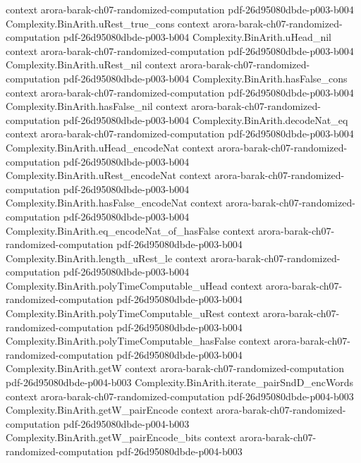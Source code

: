 \begin{theorem}
  {context}
  {arora-barak-ch07-randomized-computation}
  {pdf-26d95080dbde-p003-b004}
\proofstep
  {Complexity.BinArith.uRest_true_cons}
  {context}
  {arora-barak-ch07-randomized-computation}
  {pdf-26d95080dbde-p003-b004}
\proofstep
  {Complexity.BinArith.uHead_nil}
  {context}
  {arora-barak-ch07-randomized-computation}
  {pdf-26d95080dbde-p003-b004}
\proofstep
  {Complexity.BinArith.uRest_nil}
  {context}
  {arora-barak-ch07-randomized-computation}
  {pdf-26d95080dbde-p003-b004}
\proofstep
  {Complexity.BinArith.hasFalse_cons}
  {context}
  {arora-barak-ch07-randomized-computation}
  {pdf-26d95080dbde-p003-b004}
\proofstep
  {Complexity.BinArith.hasFalse_nil}
  {context}
  {arora-barak-ch07-randomized-computation}
  {pdf-26d95080dbde-p003-b004}
\proofstep
  {Complexity.BinArith.decodeNat_eq}
  {context}
  {arora-barak-ch07-randomized-computation}
  {pdf-26d95080dbde-p003-b004}
\proofstep
  {Complexity.BinArith.uHead_encodeNat}
  {context}
  {arora-barak-ch07-randomized-computation}
  {pdf-26d95080dbde-p003-b004}
\proofstep
  {Complexity.BinArith.uRest_encodeNat}
  {context}
  {arora-barak-ch07-randomized-computation}
  {pdf-26d95080dbde-p003-b004}
\proofstep
  {Complexity.BinArith.hasFalse_encodeNat}
  {context}
  {arora-barak-ch07-randomized-computation}
  {pdf-26d95080dbde-p003-b004}
\proofstep
  {Complexity.BinArith.eq_encodeNat_of_hasFalse}
  {context}
  {arora-barak-ch07-randomized-computation}
  {pdf-26d95080dbde-p003-b004}
\proofstep
  {Complexity.BinArith.length_uRest_le}
  {context}
  {arora-barak-ch07-randomized-computation}
  {pdf-26d95080dbde-p003-b004}
\proofstep
  {Complexity.BinArith.polyTimeComputable_uHead}
  {context}
  {arora-barak-ch07-randomized-computation}
  {pdf-26d95080dbde-p003-b004}
\proofstep
  {Complexity.BinArith.polyTimeComputable_uRest}
  {context}
  {arora-barak-ch07-randomized-computation}
  {pdf-26d95080dbde-p003-b004}
\proofstep
  {Complexity.BinArith.polyTimeComputable_hasFalse}
  {context}
  {arora-barak-ch07-randomized-computation}
  {pdf-26d95080dbde-p003-b004}
\proofstep
  {Complexity.BinArith.getW}
  {context}
  {arora-barak-ch07-randomized-computation}
  {pdf-26d95080dbde-p004-b003}
\proofstep
  {Complexity.BinArith.iterate_pairSndD_encWords}
  {context}
  {arora-barak-ch07-randomized-computation}
  {pdf-26d95080dbde-p004-b003}
\proofstep
  {Complexity.BinArith.getW_pairEncode}
  {context}
  {arora-barak-ch07-randomized-computation}
  {pdf-26d95080dbde-p004-b003}
\proofstep
  {Complexity.BinArith.getW_pairEncode_bits}
  {context}
  {arora-barak-ch07-randomized-computation}
  {pdf-26d95080dbde-p004-b003}
\proofstep

\end{theorem}
